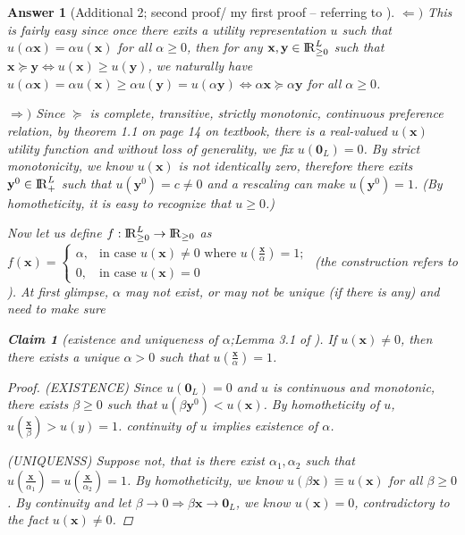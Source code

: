 \documentclass{article}
\newtheorem*{ans}{Answer}
\newtheorem{claim}{Claim}
\newcommand {\Reals}  {{\rm I \! R}}
\newcommand{\1}{{\bf 1}}
\newcommand{\0}{{\mathbf{0}}}
\newcommand{\x}{{\mathbf{x}}}
\newcommand{\y}{{\mathbf{y}}}
\newcommand{\<}{\langle}
\renewcommand{\>}{\rangle}
\begin{document}
\begin{ans}[Additional 2; second proof/ my first proof -- referring to \cite{jain2005market}]
	$\Leftarrow)$ This is fairly easy since once there exits a utility representation $u$ such that $u(\alpha \x) = \alpha u(\x)$ for all $\alpha \ge 0$, then for any $\x, \y \in \Reals_{\ge 0}^L$ such that $\x \succeq \y \Leftrightarrow u(\x) \ge u(\y) $, we naturally have $u(\alpha \x) = \alpha u(\x) \ge \alpha u(\y) =  u( \alpha \y)  \Leftrightarrow \alpha \x \succeq \alpha \y$ for all $\alpha \ge 0$.
	
	
	$\Rightarrow )$
	Since $\succeq $ is complete, transitive, strictly monotonic, continuous preference relation, by theorem 1.1 on page 14 on textbook, there is a real-valued $u(\x)$ utility function and without loss of generality, we fix $u(\0_L) = 0$. By strict monotonicity, we know $u(\x)$ is not identically zero, therefore there exits $\y^0 \in \Reals_+^L$ such that $u(\y^0) =c \ne 0$ and a rescaling can make $u(\y^0) = 1$. (By homotheticity, it is easy to recognize that $u\ge 0$.)
	
	
	Now let us define $f:\Reals_{\ge 0}^L \to \Reals_{\ge 0}$ as $f(\x)    = \left\{ \begin{array}{rl}
\alpha, &  \text{in case }u(\x) \ne 0\text{ where }u\left(\frac{\x}{ \alpha} \right) = 1;\\
0, & \text{in case }u(\x) = 0
	\end{array}\right.$  (the construction refers to \cite{jain2005market}). At first glimpse, $\alpha$ may not exist, or may not be unique (if there is any) and need to make sure
\begin{mdframed}
		\begin{claim}[existence and uniqueness of $\alpha$;Lemma 3.1 of \cite{jain2005market}] \label{claim:existence and uniqueness of alpha}
		If $u(\x) \ne 0$, then there exists a unique $ \alpha >0 $ such that $u\left( \frac{\x}{ \alpha} \right) = 1 $.
	\end{claim}
\end{mdframed}
	\begin{proof}
(EXISTENCE) Since $u(\0_L) = 0$ and $u$ is continuous and monotonic, there exists $\beta \ge 0$ such that  $u (\beta \y^0) < u(\x)$. By homotheticity of $u$, $ u\left( \frac{\x}{\beta}\right) > u(y) =1 $. continuity of $u$ implies existence of $\alpha$.

(UNIQUENSS) Suppose not, that is there exist $\alpha_1 ,\alpha_2$ such that $u \left( \frac{\x}{\alpha_1 }\right) = u \left( \frac{\x}{\alpha_2 }\right) = 1 $. By homotheticity, we know $u(\beta \x ) \equiv u(\x)$ for all $\beta \ge 0 $. By continuity and let $ \beta \to 0 \Rightarrow \beta\x \to \0_L$, we know $u(\x) =0$, contradictory to the fact $u(\x) \ne 0$.
	\end{proof}
	

\end{ans}
\end{document}
